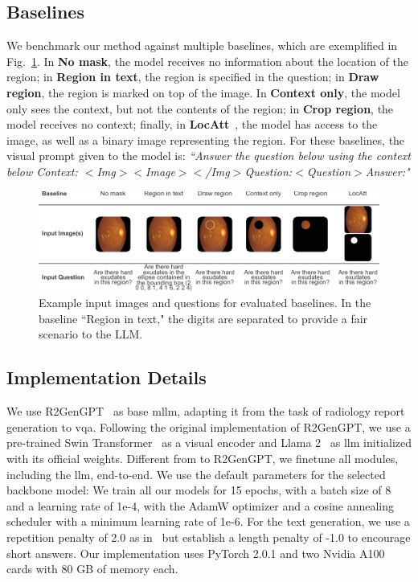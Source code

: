 \subsection{Baselines} 
We benchmark our method against multiple baselines, which are exemplified in Fig.~\ref{fig:locvqallm_baselines}. In \textbf{No mask}, the model receives no information about the location of the region; in \textbf{Region in text}, the region is specified in the question; in \textbf{Draw region}, the region is marked on top of the image. In \textbf{Context only}, the model only sees the context, but not the contents of the region; in \textbf{Crop region}, the model receives no context; finally, in \textbf{LocAtt}~\cite{tascon2023localized}, the model has access to the image, as well as a binary image representing the region. For these baselines, the visual prompt given to the model is: \textit{``Answer the question below using the context below Context: $<$Img$><$Image$><$/Img$>$Question:$<$Question$>$Answer:"}
\begin{figure}[b]
\begin{center}
\includegraphics[width=\textwidth]{Figures/Part1_LocVQA/02_llm/baselines.pdf}
\caption{Example input images and questions for evaluated baselines. In the baseline ``Region in text," the digits are separated to provide a fair scenario to the LLM.}
\label{fig:locvqallm_baselines}
\end{center}
\end{figure}

\subsection{Implementation Details} 
We use R2GenGPT~\cite{wang2023r2gengpt} as base \gls{mllm}, adapting it from the task of radiology report generation to \gls{vqa}. Following the original implementation of R2GenGPT, we use a pre-trained Swin Transformer~\cite{liu2021swin} as a visual encoder and Llama 2~\cite{touvron2023llama} as \gls{llm} initialized with its official weights. Different from to R2GenGPT, we finetune all modules, including the \gls{llm}, end-to-end. We use the default parameters for the selected backbone model: We train all our models for 15 epochs, with a batch size of 8 and a learning rate of 1e-4, with the AdamW optimizer and a cosine annealing scheduler with a minimum learning rate of 1e-6. For the text generation, we use a repetition penalty of 2.0 as in~\cite{wang2023r2gengpt} but establish a length penalty of -1.0 to encourage short answers. Our implementation uses PyTorch 2.0.1 and two Nvidia A100 cards with 80 GB of memory each.


